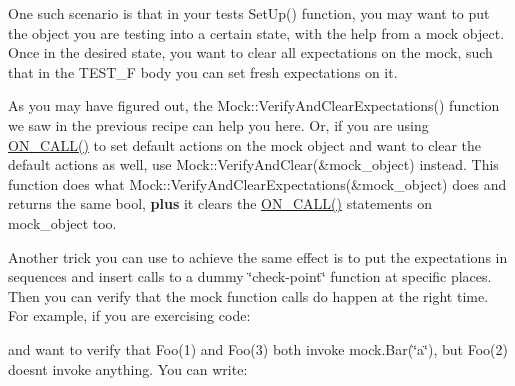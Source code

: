 One such scenario is that in your test\textquotesingle{}s {\ttfamily Set\+Up()} function, you may want to put the object you are testing into a certain state, with the help from a mock object. Once in the desired state, you want to clear all expectations on the mock, such that in the {\ttfamily T\+E\+S\+T\+\_\+F} body you can set fresh expectations on it.

As you may have figured out, the {\ttfamily Mock\+::\+Verify\+And\+Clear\+Expectations()} function we saw in the previous recipe can help you here. Or, if you are using {\ttfamily \mbox{\hyperlink{googletest-master_2googlemock_2include_2gmock_2gmock-spec-builders_8h_a5b12ae6cf84f0a544ca811b380c37334}{O\+N\+\_\+\+C\+A\+L\+L()}}} to set default actions on the mock object and want to clear the default actions as well, use {\ttfamily Mock\+::\+Verify\+And\+Clear(\&mock\+\_\+object)} instead. This function does what {\ttfamily Mock\+::\+Verify\+And\+Clear\+Expectations(\&mock\+\_\+object)} does and returns the same {\ttfamily bool}, {\bfseries{plus}} it clears the {\ttfamily \mbox{\hyperlink{googletest-master_2googlemock_2include_2gmock_2gmock-spec-builders_8h_a5b12ae6cf84f0a544ca811b380c37334}{O\+N\+\_\+\+C\+A\+L\+L()}}} statements on {\ttfamily mock\+\_\+object} too.

Another trick you can use to achieve the same effect is to put the expectations in sequences and insert calls to a dummy \char`\"{}check-\/point\char`\"{} function at specific places. Then you can verify that the mock function calls do happen at the right time. For example, if you are exercising code\+:


\begin{DoxyCode}{0}
\end{DoxyCode}


and want to verify that {\ttfamily Foo(1)} and {\ttfamily Foo(3)} both invoke {\ttfamily mock.\+Bar(\char`\"{}a\char`\"{})}, but {\ttfamily Foo(2)} doesn\textquotesingle{}t invoke anything. You can write\+:


